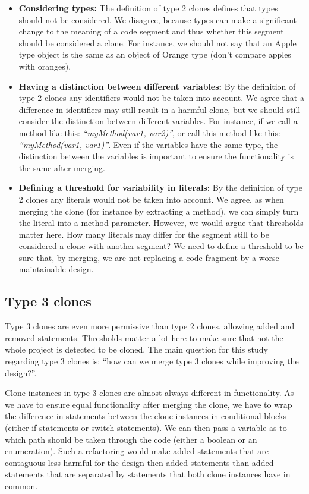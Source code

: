 \documentclass[a4paper]{article}
\begin{document}
\begin{itemize}
  \item \textbf{Considering types:} The definition of type 2 clones defines that types should not be considered. We disagree, because types can make a significant change to the meaning of a code segment and thus whether this segment should be considered a clone. For instance, we should not say that an Apple type object is the same as an object of Orange type (don't compare apples with oranges).
  \item \textbf{Having a distinction between different variables:} By the definition of type 2 clones any identifiers would not be taken into account. We agree that a difference in identifiers may still result in a harmful clone, but we should still consider the distinction between different variables. For instance, if we call a method like this: \textit{``myMethod(var1, var2)''}, or call this method like this: \textit{``myMethod(var1, var1)''}. Even if the variables have the same type, the distinction between the variables is important to ensure the functionality is the same after merging.
  \item \textbf{Defining a threshold for variability in literals:} By the definition of type 2 clones any literals would not be taken into account. We agree, as when merging the clone (for instance by extracting a method), we can simply turn the literal into a method parameter. However, we would argue that thresholds matter here. How many literals may differ for the segment still to be considered a clone with another segment? We need to define a threshold to be sure that, by merging, we are not replacing a code fragment by a worse maintainable design.
\end{itemize}

\subsection{Type 3 clones}
Type 3 clones are even more permissive than type 2 clones, allowing added and removed statements. Thresholds matter a lot here to make sure that not the whole project is detected to be cloned. The main question for this study regarding type 3 clones is: ``how can we merge type 3 clones while improving the design?''.

Clone instances in type 3 clones are almost always different in functionality. As we have to ensure equal functionality after merging the clone, we have to wrap the difference in statements between the clone instances in conditional blocks (either if-statements or switch-statements). We can then pass a variable as to which path should be taken through the code (either a boolean or an enumeration). Such a refactoring would make added statements that are contaguous less harmful for the design then added statements than added statements that are separated by statements that both clone instances have in common.
\end{document}
